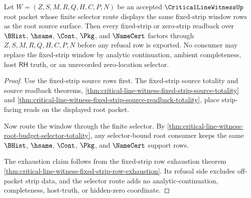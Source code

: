 \begin{theorem}
\label{thm:critical-line-witness-root-strip-window-exhaustion}
Let $W=(Z,S,M,R,Q,H,C,P,N)$ be an accepted $\CriticalLineWitnessUp$ root packet whose finite selector route displays the same fixed-strip window rows as the root source surface. Then every fixed-strip or zero-strip readback over $\BHist$, $\hsame$, $\Cont$, $\Pkg$, and $\NameCert$ factors through $Z,S,M,R,Q,H,C,P,N$ before any refusal row is exported. No consumer may replace the fixed-strip window by analytic continuation, ambient completeness, host $\mathsf{RH}$ truth, or an unrecorded zero-location selector.
\end{theorem}
\begin{proof}
Use the fixed-strip source rows first. The fixed-strip source totality and source readback theorems, \autoref{thm:critical-line-witness-fixed-strip-source-totality} and \autoref{thm:critical-line-witness-fixed-strip-source-readback-totality}, place strip-facing reads on the displayed root packet.

Now route the window through the finite selector. By \autoref{thm:critical-line-witness-root-budget-selector-totality}, any selector-bound root consumer keeps the same $\BHist$, $\hsame$, $\Cont$, $\Pkg$, and $\NameCert$ support rows.

The exhaustion claim follows from the fixed-strip row exhaustion theorem \autoref{thm:critical-line-witness-fixed-strip-row-exhaustion}. Its refusal side excludes off-packet strip data, and the selector route adds no analytic-continuation, completeness, host-truth, or hidden-zero coordinate.
\end{proof}

